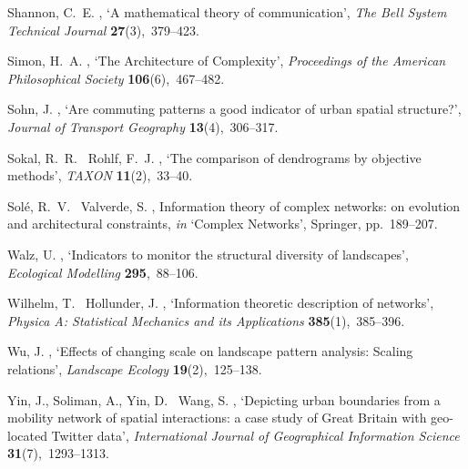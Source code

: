 \documentclass[11pt, a4paper]{article}
\begin{document}
\begin{thebibliography}{xx}
{Shannon}, C.~E.  \harvardyearright , `A mathematical
  theory of communication', {\em The Bell System Technical Journal} {\bf
  27}(3),~379--423.

Simon, H.~A.  \harvardyearright , `{The Architecture of
  Complexity}', {\em Proceedings of the American Philosophical Society} {\bf
  106}(6),~467--482.
\newline{}

Sohn, J.  \harvardyearright , `{Are commuting patterns a
  good indicator of urban spatial structure?}', {\em Journal of Transport
  Geography} {\bf 13}(4),~306--317.

Sokal, R.~R. \harvardand\ Rohlf, F.~J.  \harvardyearright
  , `{The comparison of dendrograms by objective methods}', {\em TAXON} {\bf
  11}(2),~33--40.
\newline{}

Sol{\'e}, R.~V. \harvardand\ Valverde, S.  \harvardyearright , Information theory of complex networks: on evolution
  and architectural constraints, {\em in} `Complex Networks', Springer,
  pp.~189--207.

Walz, U.  \harvardyearright , `{Indicators to monitor the
  structural diversity of landscapes}', {\em Ecological Modelling} {\bf
  295},~88--106.
\newline{}

Wilhelm, T. \harvardand\ Hollunder, J.  \harvardyearright
  , `Information theoretic description of networks', {\em Physica A:
  Statistical Mechanics and its Applications} {\bf 385}(1),~385--396.

Wu, J.  \harvardyearright , `{Effects of changing scale on
  landscape pattern analysis: Scaling relations}', {\em Landscape Ecology} {\bf
  19}(2),~125--138.

Yin, J., Soliman, A., Yin, D. \harvardand\ Wang, S.  \harvardyearright , `{Depicting urban boundaries from a mobility network
  of spatial interactions: a case study of Great Britain with geo-located
  Twitter data}', {\em International Journal of Geographical Information
  Science} {\bf 31}(7),~1293--1313.
\newline{}

\end{thebibliography}
\end{document}
